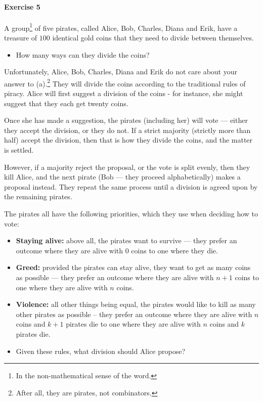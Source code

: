 \documentclass[a4paper,12pt]{article}
\begin{document}
\paragraph{Exercise 5}   A group\footnote{In the non-mathematical sense of the word.} of five pirates, called Alice, Bob, Charles, Diana and Erik, have a treasure of $100$ identical gold coins that they need to divide between themselves.
\begin{itemize}
	\item[(a)] How many ways can they divide the coins?
\end{itemize}
Unfortunately, Alice, Bob, Charles, Diana and Erik do not care about your answer to (a).\footnote{After all, they are pirates, not combinators.}  They will divide the coins according to the traditional rules of piracy.  Alice will first suggest a division of the coins - for instance, she might suggest that they each get twenty coins.

Once she has made a suggestion, the pirates (including her) will vote --- either they accept the division, or they do not.  If a strict majority (strictly more than half) accept the division, then that is how they divide the coins, and the matter is settled.

However, if a majority reject the proposal, or the vote is split evenly, then they kill Alice, and the next pirate (Bob --- they proceed alphabetically) makes a proposal instead.  They repeat the same process until a division is agreed upon by the remaining pirates.

The pirates all have the following priorities, which they use when deciding how to vote:
\begin{itemize}
	\item[1.] \textbf{Staying alive:} above all, the pirates want to survive --- they prefer an outcome where they are alive with $0$ coins to one where they die.
	\item[2.] \textbf{Greed:} provided the pirates can stay alive, they want to get as many coins as possible --- they prefer an outcome where they are alive with $n+1$ coins to one where they are alive with $n$ coins.
	\item[3.] \textbf{Violence:} all other things being equal, the pirates would like to kill as many other pirates as possible -- they prefer an outcome where they are alive with $n$ coins and $k+1$ pirates die to one where they are alive with $n$ coins and $k$ pirates die.
\end{itemize}

\begin{itemize}
	\item[(b)] Given these rules, what division should Alice propose?
\end{itemize}
\end{document}
